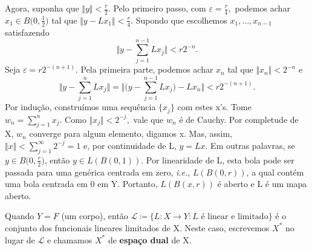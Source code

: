 \documentclass[MeasureTheory/measure_theory.tex]{subfiles}
\begin{document}
\begin{proof*}
	Agora, suponha que \(\Vert y \Vert < \frac{r}{2}.\) Pelo primeiro passo, com \(\varepsilon  = \frac{r}{4}, \) podemos achar \(x_1\in B \biggl(0, \frac{1}{2}\biggr)\) tal que \(\Vert y - Lx_1 \Vert < \frac{r}{4}.\) Supondo que escolhemos \(x_1, \dotsc , x_{n-1}\) satisfazendo
	\[
		\biggl\Vert y - \sum\limits_{j=1}^{n-1}Lx_{j} \biggr\Vert < r2^{-n}.
	\]
	Seja \(\varepsilon  = r2^{-(n+1)}.\) Pela primeira parte, podemos achar \(x_{n}\) tal que \(\Vert x_{n} \Vert < 2^{-n}\) e
	\[
		\biggl\Vert y - \sum\limits_{j=1}^{n}Lx_{j} \biggr\Vert = \biggl\Vert \biggl(y - \sum\limits_{j=1}^{n-1}Lx_{j}\biggr) - Lx_{n} \biggr\Vert < r2^{-(n+1)}.
	\]
	Por indução, construímos uma sequência \(\{x_{j}\}\) com estes x's. Tome \(w_{n} = \sum\limits_{j=1}^{n}x_{j}.\) Como \(\Vert x_{j} \Vert < 2^{-j},\) vale que \(w_{n}\) é de Cauchy. Por completude de X, \(w_{n}\) converge para algum elemento, digamos x. Mas, assim, \(\Vert x \Vert <
	\sum\limits_{j=1}^{\infty} 2^{-j} = 1\) e, por continuidade de L, \(y = Lx\). Em outras palavras, se \(y\in B \biggl(0, \frac{r}{2}\biggr)\), então \(y\in L(B(0, 1))\). Por linearidade de L, esta bola pode ser passada para uma genérica centrada em zero, \textit{i.e.}, \(L(B(0, r))\), a qual contém
	uma bola centrada em 0 em Y. Portanto, \(L(B(x, r))\) é aberto e L é um mapa aberto. \qedsymbol
\end{proof*}
Quando \(Y = F\) (um corpo), então \(\mathcal{L}\coloneqq \{L:X\rightarrow Y: L \text{ é linear e limitado}\}\) é o conjunto dos funcionais lineares limitados de X. Neste caso, escrevemos \(X^{*}\) no lugar de \(\mathcal{L}\) e chamamos \(X^{*}\) de \textbf{espaço dual} de X.
\end{document}
